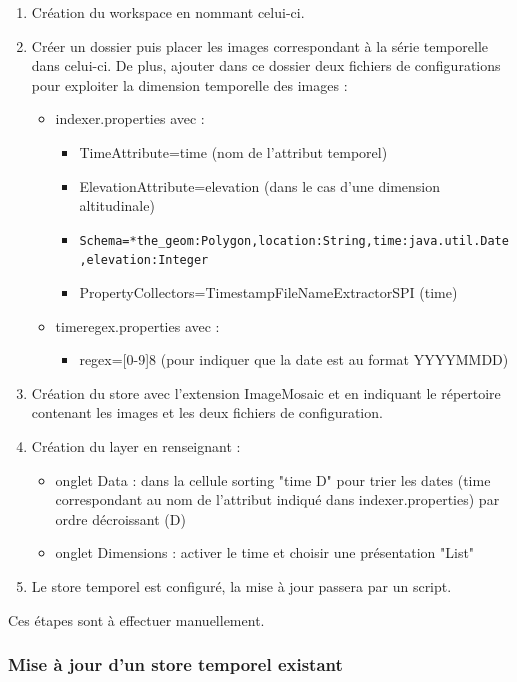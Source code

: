 \documentclass[10pt,a4paper]{article}
\begin{document}
\begin{enumerate}
\item Création du workspace en nommant celui-ci.
\item Créer un dossier puis placer les images correspondant à la série temporelle dans celui-ci. De plus, ajouter dans ce dossier deux fichiers de configurations pour exploiter la dimension temporelle des images :
\begin{itemize}
\item indexer.properties avec :
\begin{itemize}
\item TimeAttribute=time (nom de l'attribut temporel)
\item ElevationAttribute=elevation (dans le cas d'une dimension altitudinale)
\item \verb!Schema=*the_geom:Polygon,location:String,!\newline \verb!time:java.util.Date,elevation:Integer!
\item PropertyCollectors=TimestampFileNameExtractorSPI \newline [timeregex](time)
\end{itemize}
\item timeregex.properties avec :
\begin{itemize}
\item regex=[0-9]{8} (pour indiquer que la date est au format YYYYMMDD)
\end{itemize}
\end{itemize}
\item Création du store avec l'extension ImageMosaic et en indiquant le répertoire contenant les images et les deux fichiers de configuration.
\item Création du layer en renseignant :
\begin{itemize}
\item onglet Data : dans la cellule sorting "time D" pour trier les dates (time correspondant au nom de l'attribut indiqué dans indexer.properties) par ordre décroissant (D)
\item onglet Dimensions : activer le time et choisir une présentation "List"
\end{itemize}
\item Le store temporel est configuré, la mise à jour passera par un script.
\end{enumerate}

Ces étapes sont à effectuer manuellement.

\subsubsection{Mise à jour d'un store temporel existant}
\end{document}
